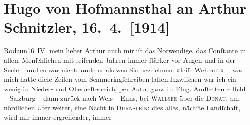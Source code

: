 

         
         \renewcommand{\erwaehntePersonen}{Personen: Rudolf Alexander Schröder}
         \renewcommand{\erwaehnteOrte}{Orte: Amstetten, Bad Ischl, Dürnstein, Enns, Niederösterreich, Oberösterreich, Rodaun, Salzburg, Semmering, Wallsee, Wels, Wien}
         \renewcommand{\erwaehnteWerke}{}
               \section[Hugo von Hofmannsthal an Arthur Schnitzler, 16. 4. {[}1914{]}]{ Hugo von Hofmannsthal an Arthur Schnitzler, 16. 4. {[}1914{]}}\nopagebreak{}\rehead{ }\begin{ledgroupsized}[t]{13cm}\normalsize\beginnumbering \toendnotes[C]{\smallbreak\pagebreak[2]} 
\toendnotes[C]{\smallbreak}\pstart
           \raggedleft{}{\pb}Rodaun16 IV.\pend
           \pstart{}mein lieber Arthur \pend\pstart
           auch mir iſt das Notwendige, das Conſtante in allem Menſchlichen mit reifenden Jahren
               immer ſtärker vor Augen und in der Seele – und es war nichts anderes als was Sie
               bezeichnen: »leiſe Wehmut« – was mich hatte dieſe Zeilen vom Semmeringſchreiben laſſen.\hspace*{1.5em}Inzwiſchen war ich ein wenig in Nieder- und Oberoeſterreich, {\pb}per Auto, ganz im Flug: Amſtetten – Iſchl – Salzburg – dann zurück nach Wels – Enns, bei
                  \textsc{Wallsee} über die \textsc{Donau}, am nördlichen Ufer weiter, eine Nacht in \textsc{Dürnstein}: dies alles, nächſte Landſchaft, wird mir immer ergreifender, immer

\end{ledgroupsized}
